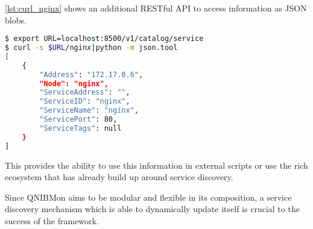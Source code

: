 \autoref{lst:curl_nginx} shows an additional RESTful API to access information as JSON blobs.

\begin{lstlisting}[language=bash,
    caption={Exposure of services via RESTful API.},
    label={lst:curl_nginx}]
$ export URL=localhost:8500/v1/catalog/service
$ curl -s $URL/nginx|python -m json.tool
[
    {
        "Address": "172.17.0.6",
        "Node": "nginx",
        "ServiceAddress": "",
        "ServiceID": "nginx",
        "ServiceName": "nginx",
        "ServicePort": 80,
        "ServiceTags": null
    }
]
\end{lstlisting}
This provides the ability to use this information in external scripts or use the rich ecosystem that has already build up around service discovery.

Since QNIBMon aims to be modular and flexible in its composition, a service discovery mechanism which is able to dynamically update itself is crucial to the success of the framework.
